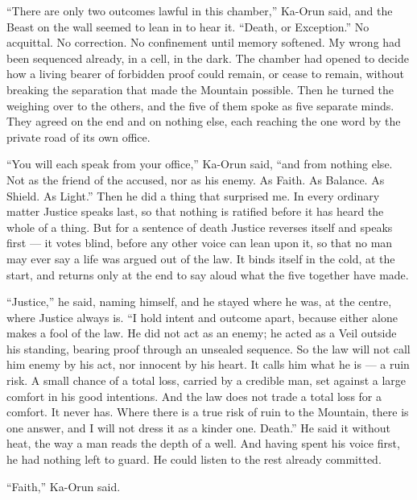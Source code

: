 ``There are only two outcomes lawful in this chamber,'' Ka-Orun said, and the Beast on the wall seemed to lean in to hear it. ``Death, or Exception.'' No acquittal. No correction. No confinement until memory softened. My wrong had been sequenced already, in a cell, in the dark. The chamber had opened to decide how a living bearer of forbidden proof could remain, or cease to remain, without breaking the separation that made the Mountain possible. Then he turned the weighing over to the others, and the five of them spoke as five separate minds. They agreed on the end and on nothing else, each reaching the one word by the private road of its own office.\par

``You will each speak from your office,'' Ka-Orun said, ``and from nothing else. Not as the friend of the accused, nor as his enemy. As Faith. As Balance. As Shield. As Light.'' Then he did a thing that surprised me. In every ordinary matter Justice speaks last, so that nothing is ratified before it has heard the whole of a thing. But for a sentence of death Justice reverses itself and speaks first --- it votes blind, before any other voice can lean upon it, so that no man may ever say a life was argued out of the law. It binds itself in the cold, at the start, and returns only at the end to say aloud what the five together have made.\par

``Justice,'' he said, naming himself, and he stayed where he was, at the centre, where Justice always is. ``I hold intent and outcome apart, because either alone makes a fool of the law. He did not act as an enemy; he acted as a Veil outside his standing, bearing proof through an unsealed sequence. So the law will not call him enemy by his act, nor innocent by his heart. It calls him what he is --- a ruin risk. A small chance of a total loss, carried by a credible man, set against a large comfort in his good intentions. And the law does not trade a total loss for a comfort. It never has. Where there is a true risk of ruin to the Mountain, there is one answer, and I will not dress it as a kinder one. Death.'' He said it without heat, the way a man reads the depth of a well. And having spent his voice first, he had nothing left to guard. He could listen to the rest already committed.\par

``Faith,'' Ka-Orun said.\par

